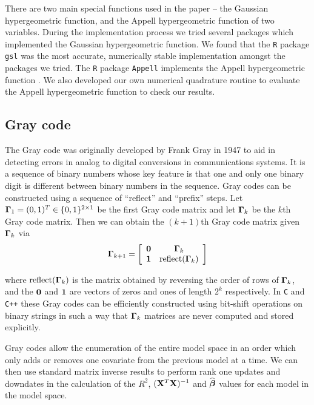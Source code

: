 There are two main special functions used in the paper -- the Gaussian
hypergeometric function, and the Appell hypergeometric function of two
variables. During the implementation process we tried several packages which
implemented the Gaussian hypergeometric function.  We found that the {\tt R}
package {\tt gsl} \citep{Hankin2006} was the most accurate, numerically stable
implementation amongst the packages we tried. The {\tt R} package {\tt Appell}
implements the Appell hypergeometric function \citep{Bove2013}. We also
developed our own numerical quadrature routine to evaluate the Appell
hypergeometric function to check our results.

\subsection{Gray code} 
\label{sec:GrayCode}

\noindent The Gray code was originally developed by Frank Gray in 1947
\cite[][Section 22.3]{PressEtal2007} to aid in detecting errors in analog to
digital conversions in communications systems. It is a sequence of binary
numbers whose key feature is that one and only one binary digit is different
between binary numbers in the sequence.  Gray codes can be constructed using a
sequence of ``reflect'' and ``prefix'' steps.  Let ${\boldsymbol \Gamma}_1 = (0,1)^T \in
\{0,1\}^{2\times 1}$ be the first Gray code matrix and let ${\boldsymbol \Gamma}_k$ be the
$k$th Gray code matrix. Then we can obtain the $(k+1)$th Gray code matrix given
${\boldsymbol \Gamma}_k$ via 
$$
\displaystyle {\boldsymbol\Gamma}_{k+1} = \left[\begin{array}{cc}
{\bf0} & {\boldsymbol \Gamma}_k \\
{\bf 1}  & \mbox{reflect}({\boldsymbol \Gamma}_k)
\end{array} \right]
$$ 

\noindent where $\mbox{reflect}({\boldsymbol \Gamma}_k)$ is the matrix obtained by reversing
the order of rows of ${\boldsymbol \Gamma}_k$, and the ${\bf 0}$ and ${\bf 1}$ are vectors of
zeros and ones of length $2^k$ respectively. In {\tt C} and {\tt C++} these
Gray codes can be efficiently constructed using bit-shift operations on binary
strings in such a way that ${\boldsymbol \Gamma}_{k}$ matrices are never computed and stored
explicitly.

Gray codes allow the enumeration of the entire model space in an order which
only adds or removes one covariate from the previous model at a time. We can
then use standard matrix inverse results to perform rank one updates and
downdates in the calculation of the $R^2$, $({\bf X}^T{\bf X})^{-1}$ and
$\widehat{{\boldsymbol \beta}}$ values for each model in the model space.

